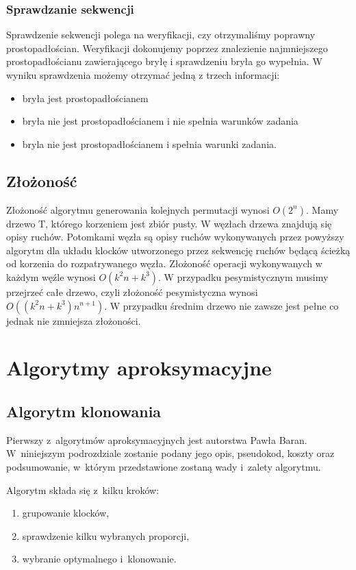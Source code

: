\documentclass[12pt]{article}
\begin{document}
\subsubsection{Sprawdzanie sekwencji}
Sprawdzenie sekwencji polega na weryfikacji, czy otrzymaliśmy poprawny prostopadłościan. Weryfikacji dokonujemy
poprzez znalezienie najmniejszego prostopadłościanu zawierającego bryłę i sprawdzeniu bryła go wypełnia.
 W wyniku sprawdzenia możemy otrzymać jedną z trzech informacji:
\begin{itemize}
 \item bryła jest prostopadłościanem
 \item bryła nie jest prostopadłościanem i nie spełnia warunków zadania
 \item bryla nie jest prostopadłościanem i spełnia warunki zadania.
\end{itemize}

\subsection{Złożoność}
Złożoność algorytmu generowania kolejnych permutacji wynosi $O(2^n)$.
Mamy drzewo T, którego korzeniem jest zbiór pusty. W węzłach drzewa znajdują się opisy ruchów.
Potomkami węzła są opisy ruchów wykonywanych przez powyższy algorytm dla układu klocków utworzonego 
przez sekwencję ruchów będącą ścieżką od korzenia do rozpatrywanego węzła. 
Złożoność operacji wykonywanych w każdym węźle wynosi $O(k^2n+k^3)$.
W przypadku pesymistycznym musimy przejrzeć całe drzewo, czyli złożoność pesymistyczna wynosi $O((k^2n+k^3)n^{n+1})$.
W przypadku średnim drzewo nie zawsze jest pełne co jednak nie zmniejsza złożoności. 


\section{Algorytmy aproksymacyjne}

\subsection{Algorytm klonowania}
Pierwszy z~algorytmów aproksymacyjnych jest autorstwa Pawła Baran.
W~niniejszym podrozdziale zostanie podany jego opis, pseudokod, koszty oraz
podsumowanie, w~którym przedstawione zostaną wady i~zalety algorytmu.

Algorytm składa się z~kilku kroków:
\begin{enumerate}
	\item grupowanie klocków,
	\item sprawdzenie kilku wybranych proporcji,
	\item wybranie optymalnego i~klonowanie.
\end{enumerate}
\end{document}
